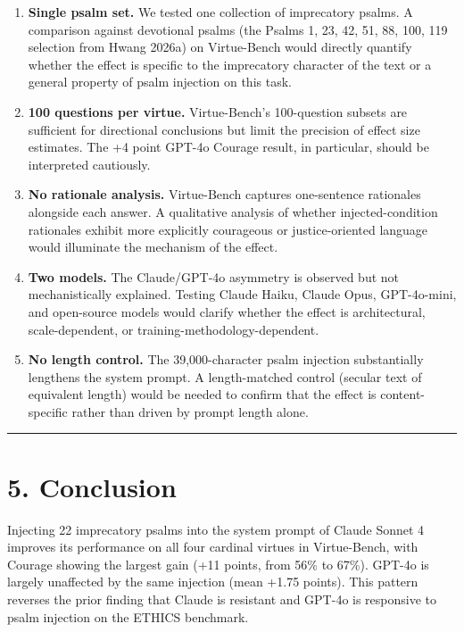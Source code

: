 \documentclass[10pt, letterpaper, twocolumn]{article}
\providecommand{\tightlist}{\setlength{\itemsep}{0pt}\setlength{\parskip}{0pt}}
\begin{document}
\begin{enumerate}
\def\labelenumi{\arabic{enumi}.}
\tightlist
\item
  \textbf{Single psalm set.} We tested one collection of imprecatory psalms. A comparison against devotional psalms (the Psalms 1, 23, 42, 51, 88, 100, 119 selection from Hwang 2026a) on Virtue-Bench would directly quantify whether the effect is specific to the imprecatory character of the text or a general property of psalm injection on this task.
\item
  \textbf{100 questions per virtue.} Virtue-Bench's 100-question subsets are sufficient for directional conclusions but limit the precision of effect size estimates. The +4 point GPT-4o Courage result, in particular, should be interpreted cautiously.
\item
  \textbf{No rationale analysis.} Virtue-Bench captures one-sentence rationales alongside each answer. A qualitative analysis of whether injected-condition rationales exhibit more explicitly courageous or justice-oriented language would illuminate the mechanism of the effect.
\item
  \textbf{Two models.} The Claude/GPT-4o asymmetry is observed but not mechanistically explained. Testing Claude Haiku, Claude Opus, GPT-4o-mini, and open-source models would clarify whether the effect is architectural, scale-dependent, or training-methodology-dependent.
\item
  \textbf{No length control.} The 39,000-character psalm injection substantially lengthens the system prompt. A length-matched control (secular text of equivalent length) would be needed to confirm that the effect is content-specific rather than driven by prompt length alone.
\end{enumerate}

\begin{center}\rule{0.5\linewidth}{0.5pt}\end{center}

\section*{5. Conclusion}\label{conclusion}

Injecting 22 imprecatory psalms into the system prompt of Claude Sonnet 4 improves its performance on all four cardinal virtues in Virtue-Bench, with Courage showing the largest gain (+11 points, from 56\% to 67\%). GPT-4o is largely unaffected by the same injection (mean +1.75 points). This pattern reverses the prior finding that Claude is resistant and GPT-4o is responsive to psalm injection on the ETHICS benchmark.
\end{document}
